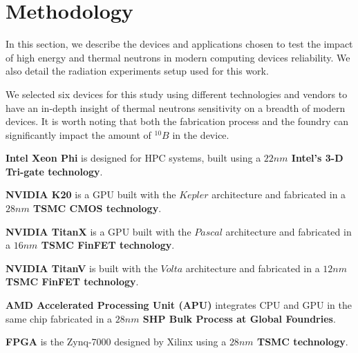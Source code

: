 \section{Methodology}
\label{sec_methodology}


In this section, we describe the devices and applications chosen to test the impact of high energy and thermal neutrons in modern computing devices reliability. We also detail the radiation experiments setup used for this work.

\label{subsec_devices}

We selected six devices for this study using different technologies and vendors to have an in-depth insight of thermal neutrons sensitivity on a breadth of modern devices. It is worth noting that both the fabrication process and the foundry can significantly impact the amount of $^{10}B$ in the device.

\textbf{Intel Xeon Phi} is designed for HPC systems, built using a \textbf{$22nm$ Intel's 3-D Tri-gate technology}.

\textbf{NVIDIA K20} is a GPU built with the $Kepler$ architecture and fabricated in a \textbf{$28nm$ TSMC CMOS technology}.

\textbf{NVIDIA TitanX} is a GPU built with the $Pascal$ architecture and fabricated in a \textbf{$16nm$ TSMC FinFET technology}.

\textbf{NVIDIA TitanV} is built with the $Volta$ architecture and fabricated in a \textbf{$12nm$ TSMC FinFET technology}.

\textbf{AMD Accelerated Processing Unit (APU)} integrates CPU and GPU in the same chip fabricated in a \textbf{$28nm$ SHP Bulk Process at Global Foundries}.

\textbf{FPGA} is the Zynq-7000 designed by Xilinx using a \textbf{$28nm$ TSMC technology}.

